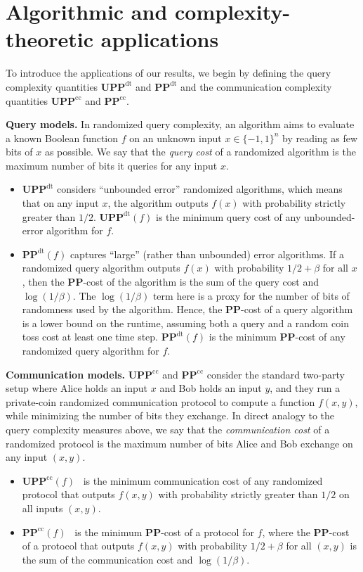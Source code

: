 \documentclass[11pt]{article}
\numberwithin{equation}{section}
\theoremstyle{definition}
\theoremstyle{plain}
\newcommand{\PP}{\mathbf{PP}}
\newcommand{\PPcc}{\mathbf{PP}^{\text{cc}}}
\newcommand{\UPP}{\mathbf{UPP}}
\newcommand{\UPPcc}{\mathbf{UPP}^{\text{cc}}}
\begin{document}
\section{Algorithmic and complexity-theoretic applications} \label{sec:applications}
\label{s2}
To introduce the applications of our results, we begin by defining the query complexity quantities $\UPP^{\text{dt}}$ and $\PP^{\text{dt}}$ and the communication complexity quantities $\UPP^{\text{cc}}$ and $\PP^{\text{cc}}$.

\medskip \noindent \textbf{Query models.} 
In randomized query complexity, an algorithm aims to evaluate a known Boolean function $f$ on an unknown input $x \in \{-1, 1\}^n$ by reading as few bits of $x$ as possible. We say that the \emph{query cost} of a randomized algorithm is the maximum number of bits it queries for any input $x$.

\begin{itemize}
	\item $\UPP^{\text{dt}}$ considers ``unbounded error'' randomized algorithms, which means that on any input $x$, the algorithm outputs $f(x)$ with probability strictly greater than $1/2$. 
	$\UPP^{\text{dt}}(f)$ is the minimum query cost of any 
	unbounded-error %
	algorithm for $f$.
	\item $\PP^{\text{dt}}(f)$ captures ``large'' (rather than unbounded) error algorithms. If
	a randomized query algorithm outputs $f(x)$ with probability $1/2 + \beta$ for all $x$, then the $\PP$-cost
	of the algorithm 
	is the sum of the query cost and $\log(1/\beta)$. The $\log(1/\beta)$ term here is a proxy for the number of bits of randomness used by the algorithm. Hence,
	the $\PP$-cost of a query algorithm is a lower bound on the runtime, assuming both a query and a random coin toss cost at least one time step.
	$\PP^{\text{dt}}(f)$ is the minimum $\PP$-cost of any randomized query algorithm for $f$.
\end{itemize}

\noindent \textbf{Communication models.} 
$\UPPcc$ and $\PPcc$
consider the standard two-party setup
where Alice holds an input $x$ and Bob holds an input $y$, and they run a private-coin randomized communication protocol to compute a function $f(x, y)$, while minimizing the number of bits they  exchange. In direct analogy to the query complexity measures above,
we say that the \emph{communication cost} of a randomized protocol is the maximum number of bits Alice and Bob exchange on any input $(x, y)$.

\begin{itemize}
	\item $\UPP^{\text{cc}}(f)$~\cite{paturisimon} is the minimum communication cost of any randomized protocol that outputs $f(x, y)$ with probability strictly greater than $1/2$ on all inputs $(x, y)$.
	\vspace{-1mm}
	\item $\PP^{\text{cc}}(f)$~\cite{babaietal} is the minimum $\PP$-cost of a protocol for $f$, where the $\PP$-cost of a protocol that outputs $f(x, y)$ with probability $1/2 + \beta$ for all $(x, y)$ is the sum of the communication cost and $\log(1/\beta)$.
\end{itemize}
\end{document}
